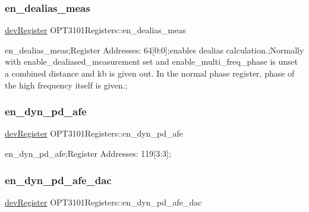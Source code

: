 \subsubsection{\texorpdfstring{en\+\_\+dealias\+\_\+meas}{en\_dealias\_meas}}
{\footnotesize\ttfamily \mbox{\hyperlink{classdev_register}{dev\+Register}} O\+P\+T3101\+Registers\+::en\+\_\+dealias\+\_\+meas}



en\+\_\+dealias\+\_\+meas;Register Addresses\+: 64\mbox{[}0\+:0\mbox{]};enables dealias calculation.;Normally with enable\+\_\+dealiased\+\_\+measurement set and enable\+\_\+multi\+\_\+freq\+\_\+phase is unset a combined distance and kb is given out. In the normal phase register, phase of the high frequency itself is given.; 

\mbox{\label{class_o_p_t3101_registers_a1d024f0ebab115594b49d5652f2edb4f}} 
\subsubsection{\texorpdfstring{en\+\_\+dyn\+\_\+pd\+\_\+afe}{en\_dyn\_pd\_afe}}
{\footnotesize\ttfamily \mbox{\hyperlink{classdev_register}{dev\+Register}} O\+P\+T3101\+Registers\+::en\+\_\+dyn\+\_\+pd\+\_\+afe}



en\+\_\+dyn\+\_\+pd\+\_\+afe;Register Addresses\+: 119\mbox{[}3\+:3\mbox{]}; 

\mbox{\label{class_o_p_t3101_registers_ac696b5b40353a14fb5c1d7e2baf45305}} 
\subsubsection{\texorpdfstring{en\+\_\+dyn\+\_\+pd\+\_\+afe\+\_\+dac}{en\_dyn\_pd\_afe\_dac}}
{\footnotesize\ttfamily \mbox{\hyperlink{classdev_register}{dev\+Register}} O\+P\+T3101\+Registers\+::en\+\_\+dyn\+\_\+pd\+\_\+afe\+\_\+dac}




